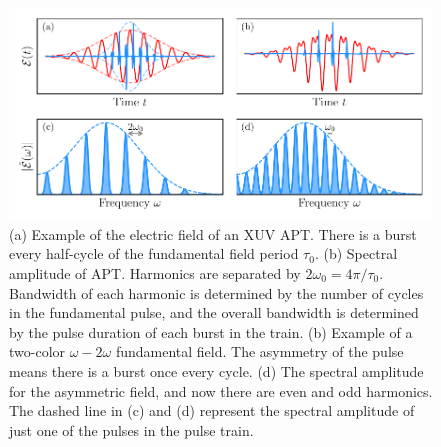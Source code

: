 \begin{figure}
	\centering
	\includegraphics[width=1.0\textwidth]{figures/Introduction/time_to_freq.pdf}
	\caption[Example electric field of XUV APT and its frequency spectrum]{(a) Example of the electric field of an XUV APT.  There is a burst every half-cycle of the fundamental field period $\tau_0$.  (b)  Spectral amplitude of APT.  Harmonics are separated by $2\omega_0=4\pi/\tau_0$.  Bandwidth of each harmonic is determined by the number of cycles in the fundamental pulse, and the overall bandwidth is determined by the pulse duration of each burst in the train. (b) Example of a two-color $\omega-2\omega$ fundamental field.  The asymmetry of the pulse means there is a burst once every cycle. (d) The spectral amplitude for the asymmetric field, and now there are even and odd harmonics.  The dashed line in (c) and (d) represent the spectral amplitude of just one of the pulses in the pulse train.}
	\label{fig:time_to_freq}
\end{figure}

